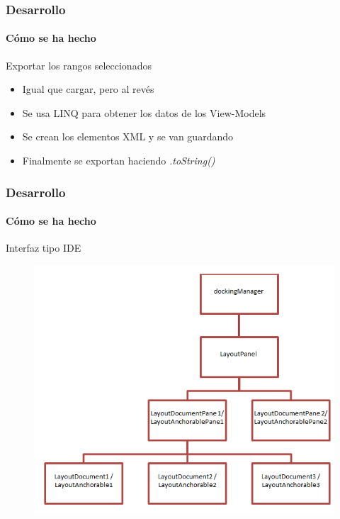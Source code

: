 \begin{frame}
    \frametitle{Desarrollo}
    \framesubtitle{C\'omo se ha hecho}
    
    \begin{block}{Exportar los rangos seleccionados}
        
        \begin{itemize}
            \item Igual que cargar, pero al rev\'es
            \item Se usa LINQ para obtener los datos de los View-Models
            \item Se crean los elementos XML y se van guardando
            \item Finalmente se exportan haciendo \emph{.toString()}
        \end{itemize}
        
    \end{block}
\end{frame}

\begin{frame}
    \frametitle{Desarrollo}
    \framesubtitle{C\'omo se ha hecho}
    
    \begin{block}{Interfaz tipo IDE}
        \begin{figure}
            \centering
            \includegraphics[width=0.6\linewidth]{Figures/AvalonDock.PNG}
        \end{figure}
        

    \end{block}
\end{frame}

